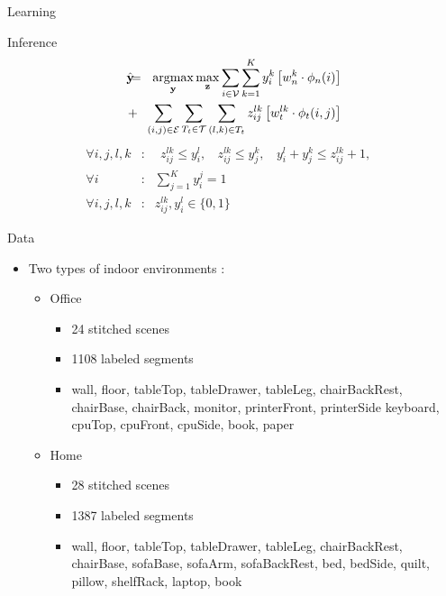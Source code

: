 \documentclass{beamer}
\DeclareMathOperator*{\argmax}{argmax}
\newcommand{\y}{{\mathbf y}}     %
\newcommand{\ysc}[2]{{y_{#1}^{#2}}}    %
\newcommand{\zsc}[2]{{z_{#1}^{#2}}}    %
\newcommand{\fn}[1]{{\phi_n(#1)}}      %
\newcommand{\fe}[3]{{\phi_{#1}(#2,#3)}}%
\newcommand{\wn}[1]{{w_n^{#1}}}        %
\newcommand{\we}[3]{{w_{#1}^{#2#3}}}   %
\begin{document}
\begin{frame}{Learning}

\end{frame}

\begin{frame}{Inference}
 \begin{eqnarray*}
\hat{\y}\!\!\!&=&\!\!\!\argmax_{\y}\max_{\mathbf z} \sum_{i \in \mathcal{V}} \sum_{k=1}^{K} \ysc{i}{k} \left[\wn{k} \cdot \fn{i} \right] \\
&+&  \!\!\!\sum_{(i,j)\in \mathcal{E}}  \sum_{T_t \in {\cal T}} \sum_{(l,k)\in T_t} \zsc{ij}{lk} \left[\we{t}{l}{k} \cdot \fe{t}{i}{j}\right] 
 \label{eq:relaxobj}\\
\end{eqnarray*}
 \begin{eqnarray*}
  \forall i,j,l,k &:& \:\: \zsc{ij}{lk}\le \ysc{i}{l}, \:\:\:\:
\zsc{ij}{lk}\le \ysc{j}{k},\:\:\:\:
\ysc{i}{l} + \ysc{j}{k} \le \zsc{ij}{lk}+1,\:\:\:\: \\
\forall i &:& \sum_{j=1}^{K} y_i^j = 1\\
\forall i,j,l,k &:& \zsc{ij}{lk},\ysc{i}{l} \in \{ 0,1 \} \label{eq:relaxconst}
\end{eqnarray*}

 
\end{frame}

\begin{frame}{Data}
\begin{itemize}
   \item Two types of indoor environments : 
   \begin{itemize}
   \item Office 
   	\begin{itemize}
	\item 24 stitched scenes
	\item 1108 labeled segments
	\item wall, floor, tableTop, tableDrawer, tableLeg, chairBackRest, chairBase, chairBack, monitor, printerFront, printerSide keyboard, cpuTop, cpuFront, cpuSide, book, paper
	\end{itemize}
   \item Home
   	\begin{itemize}
   	\item  28 stitched scenes
	\item 1387 labeled segments
	\item wall, floor, tableTop, tableDrawer, tableLeg, chairBackRest, chairBase, sofaBase, sofaArm, sofaBackRest, bed, bedSide, quilt, pillow, shelfRack, laptop, book 
	\end{itemize} 
\end{itemize}
\end{itemize}
\end{frame}
\end{document}
